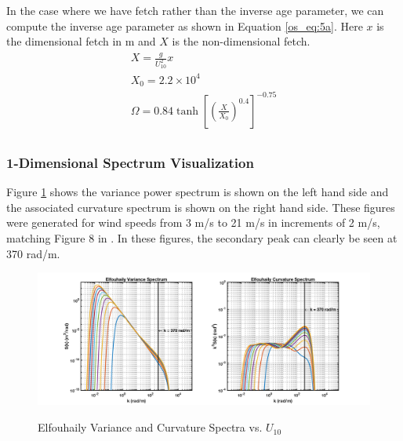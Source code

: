 In the case where we have fetch rather than the inverse age parameter, we can compute the inverse age parameter as shown in Equation \ref{os_eq:5a}. Here $x$ is the dimensional fetch in m and $X$ is the non-dimensional fetch.
\begin{equation}
\label{os_eq:5a}
\begin{gathered}
 X = \frac{g}{U_{10}^2}x\\
 X_0 = 2.2 \times 10^4 \\
 \Omega = 0.84\tanh\left[\left(\frac{X}{X_0} \right)^{0.4} \right]^{-0.75} \\
\end{gathered}
\end{equation}
\renewcommand{\baselinestretch}{2} \small\normalsize

\subsubsection{1-Dimensional Spectrum Visualization}
Figure \ref{os_fig:3} shows the variance power spectrum is shown on the left hand side and the associated curvature spectrum is shown on the right hand side. These figures were generated for wind speeds from 3 m/s to 21 m/s in increments of 2 m/s, matching Figure 8 in \cite{elfouhaily}. In these figures, the secondary peak can clearly be seen at 370 rad/m.
\begin{figure}[H]
  \begin{center}
\includegraphics[width=6in]{../media/Ocean_Surface/elf_variance_curvature_spectrum.png}
  \end{center}
  \renewcommand{\baselinestretch}{1} \small\normalsize
  \begin{quote}
    \caption[Elfouhaily Variance and Curvature Spectra vs. $U_{10}$]{Elfouhaily Variance and Curvature Spectra vs. $U_{10}$\label{os_fig:3}}
  \end{quote}
\end{figure}
\renewcommand{\baselinestretch}{2} \small\normalsize

